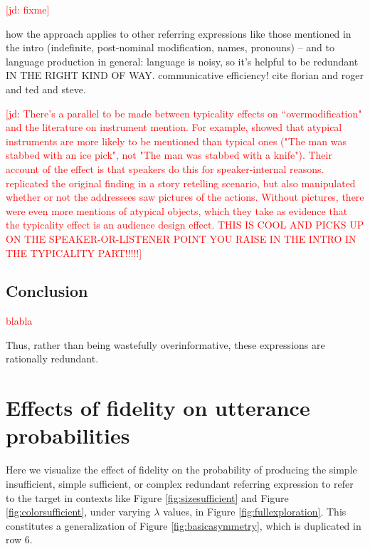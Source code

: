 \documentclass[11pt]{article}
\newcommand{\red}[1]{\textcolor{Red}{#1}}
\newcommand{\jd}[1]{\textcolor{Red}{[jd: #1]}}
\newcommand{\figref}[1]{Figure \ref{#1}}
\begin{document}
\jd{fixme}

how the approach applies to other referring expressions like those mentioned in the intro (indefinite, post-nominal modification, names, pronouns) -- and to language production in general: language is noisy, so it's helpful to be redundant IN THE RIGHT KIND OF WAY. communicative efficiency! cite florian and roger and ted and steve. 

\jd{There's a parallel to be made between typicality effects on ``overmodification" and the literature on instrument mention. For example, \cite{brown1987} showed that atypical instruments are more likely to be mentioned than typical ones ("The man was stabbed with an ice pick", not "The man was stabbed with a knife"). Their account of the effect is that speakers do this for speaker-internal reasons. \cite{lockridge2002} replicated the original finding in a story retelling scenario, but also manipulated whether or not the addressees saw pictures of the actions. Without pictures, there were even more mentions of atypical objects, which they take as evidence that the typicality effect is an audience design effect. THIS IS COOL AND PICKS UP ON THE SPEAKER-OR-LISTENER POINT YOU RAISE IN THE INTRO IN THE TYPICALITY PART!!!!!}

\subsection{Conclusion}
\label{sec:conclusion}

\red{blabla}

Thus, rather than being wastefully overinformative, these expressions are rationally redundant.

\appendix

\section{Effects of fidelity on utterance probabilities}
\label{app:modelexploration}

Here we visualize the effect of fidelity on the probability of producing the simple insufficient, simple sufficient, or complex redundant referring expression to refer to the target in contexts like  \figref{fig:sizesufficient} and \figref{fig:colorsufficient}, under varying $\lambda$ values, in \figref{fig:fullexploration}. This constitutes a generalization of \figref{fig:basicasymmetry}, which is duplicated in row 6.
\end{document}
